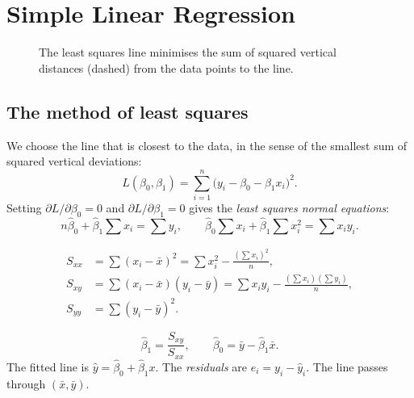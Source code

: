 \section{Simple Linear Regression}

\begin{figure}[h]
\centering
{}
\caption{The least squares line minimises the sum of squared vertical distances (dashed) from the data points to the line.}
\end{figure}

\subsection*{The method of least squares}

We choose the line that is closest to the data, in the sense of the smallest sum of squared vertical deviations:
\[ L(\beta_0,\beta_1)=\sum_{i=1}^n\big(y_i-\beta_0-\beta_1x_i\big)^2. \]
Setting $\partial L/\partial\beta_0=0$ and $\partial L/\partial\beta_1=0$ gives the \emph{least squares normal equations}:
\[ n\hat\beta_0+\hat\beta_1\sum x_i=\sum y_i,\qquad\hat\beta_0\sum x_i+\hat\beta_1\sum x_i^2=\sum x_iy_i. \]

\begin{definition}
\begin{align*}
S_{xx}&=\sum(x_i-\bar{x})^2=\sum x_i^2-\frac{(\sum x_i)^2}n,\\
S_{xy}&=\sum(x_i-\bar{x})(y_i-\bar{y})=\sum x_iy_i-\frac{(\sum x_i)(\sum y_i)}n,\\
S_{yy}&=\sum(y_i-\bar{y})^2.
\end{align*}
\end{definition}

\begin{theorem}\label{thm:ls}
\[ \hat\beta_1=\frac{S_{xy}}{S_{xx}},\qquad\hat\beta_0=\bar{y}-\hat\beta_1\bar{x}. \]
The fitted line is $\hat{y}=\hat\beta_0+\hat\beta_1x$. The \emph{residuals} are $e_i=y_i-\hat{y}_i$. The line passes through $(\bar{x},\bar{y})$.
\end{theorem}

